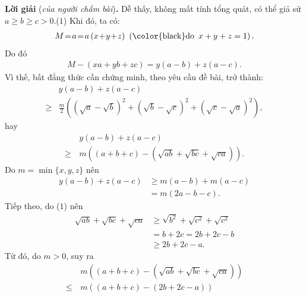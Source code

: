 \begin{multicols}{2}
	\columnbreak
	\textbf{\color{thachthuctoanhoc}Lời giải} (\textit{của người chấm bài})\textbf{\color{thachthuctoanhoc}.}
	\vskip 0.05cm
	Dễ thấy, không mất tính tổng quát, có thể giả sử $a \ge b \ge c > 0$.\hfill                                                              ($1$)
	\vskip 0.05cm
	Khi đó, ta có:
	\begin{align*}
		M \!=\! a \!=\! a\left( {x \!+\! y \!+\! z} \right)\,\,\left( {{\text{\color{black}do\, }}x + y + z = 1} \right).
	\end{align*}
	Do đó
	\begin{align*}
		M - \left( {xa + yb + zc} \right) = y\left( {a - b} \right) + z\left( {a - c} \right).
	\end{align*}
	Vì thế, bất đẳng thức cần chứng minh, theo yêu cầu đề bài, trở thành:
	\begin{align*}
		&y\left( {a - b} \right) + z\left( {a - c} \right) \\
		\ge& \frac{m}{2}\!\!\left(\!(\!\sqrt a  \!-\!\! \sqrt b)^2 \!\!+\! (\!\sqrt b  \!-\! \sqrt c )^2 \!+\! (\!\sqrt c  \!-\! \sqrt a)^2\!\! \right)\!,
	\end{align*}
	hay
	\begin{align*}
		&y\left( {a - b} \right) + z\left( {a - c} \right) \\
		\ge \,&m\!\!\left(\!\!(a \!+\! b \!+\! c \!) \!-\! (\!\!\sqrt {ab}  \!+\! \sqrt {bc}  \!+\! \sqrt {ca})\!\! \right)\!\!. \tag{$2$}
	\end{align*}
	Do $m = \min\{x, y, z\}$ nên
	\begin{align*}
		y\left( {a \!-\! b} \right)\! +\! z\left( {a \!-\! c} \right) &\ge m\left( {a \!-\! b} \right) \!+\! m\left( {a \!-\! c} \right) \\
		&= m\left( {2a - b - c} \right). \tag{$3$}
	\end{align*}
	Tiếp theo, do ($1$) nên
	\begin{align*}
		\sqrt {ab}  + \sqrt {bc}  + \sqrt {ca} & \ge \sqrt {{b^2}}  + \sqrt {{c^2}}  + \sqrt {{c^2}}  \\
		&= b \!+\! 2c = 2b \!+\! 2c \!-\! b \\
		&\ge 2b + 2c - a.
	\end{align*}
	Từ đó, do $m > 0$, suy ra
	\begin{align*}
		&m\left( {\left( {a + b + c} \right) - \left( {\sqrt {ab}  + \sqrt {bc}  + \sqrt {ca} } \right)} \right) \\
		\le \,&m\left( {\left( {a + b + c} \right) - \left( {2b + 2c - a} \right)} \right) \\

\end{align*}
\end{multicols}
